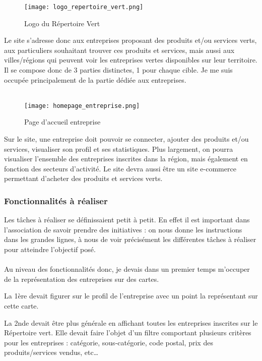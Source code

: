 \begin{figure}[H]
    \centering
    \texttt{[image: logo\_repertoire\_vert.png]}
    \caption{Logo du Répertoire Vert}
\end{figure}

Le site s'adresse donc aux entreprises proposant des produits et/ou services verts, aux particuliers souhaitant trouver ces produits et services, 
mais aussi aux villes/régions qui peuvent voir les entreprises vertes disponibles sur leur territoire. Il se compose donc de 3 parties distinctes, 1 pour chaque cible.
Je me suis occupée principalement de la partie dédiée aux entreprises.
\\\\
\begin{figure}[H]
    \centering
    \texttt{[image: homepage\_entreprise.png]}
    \caption{Page d'accueil entreprise}
\end{figure}


Sur le site, une entreprise doit pouvoir se connecter, ajouter des produits et/ou services, visualiser son profil et ses statistiques.
Plus largement, on pourra visualiser l'ensemble des entreprises inscrites dans la région, mais également en fonction des secteurs d'activité. Le site devra aussi être un site e-commerce permettant d'acheter des produits et services verts.

\subsubsection{Fonctionnalités à réaliser}

Les tâches à réaliser se définissaient petit à petit. En effet il est important dans l'association de savoir prendre des initiatives : 
on nous donne les instructions dans les grandes lignes, à nous de voir précisément les différentes tâches à réaliser pour atteindre l'objectif posé.
\\\\
Au niveau des fonctionnalités donc, je devais dans un premier temps m'occuper de la représentation des entreprises sur des cartes. 

La 1ère devait figurer sur le profil de l'entreprise avec un point la représentant sur cette carte.

La 2nde devait être plus générale en affichant toutes les entreprises inscrites sur le Répertoire vert. 
Elle devait faire l'objet d'un filtre comportant plusieurs critères pour les entreprises : catégorie, sous-catégorie, code postal, prix des produits/services vendus, etc\dots

